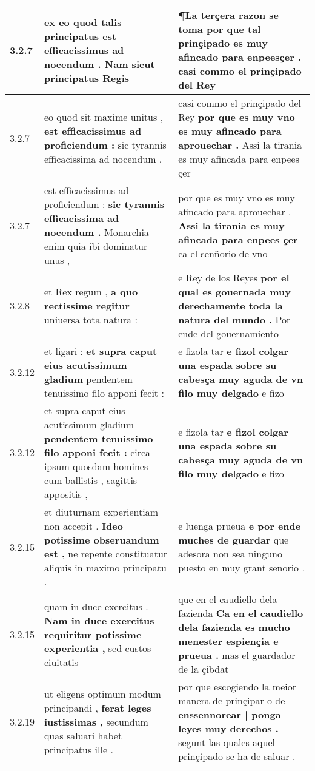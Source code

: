 \begin{tabular}{|p{1cm}|p{6.5cm}|p{6.5cm}|}
3.2.7 & ex eo quod talis principatus \textbf{ est efficacissimus ad nocendum . } Nam sicut principatus Regis & ¶La terçera razon se toma \textbf{ por que tal prinçipado es muy afincado para enpeesçer . } casi commo el prinçipado del Rey \\\hline
3.2.7 & eo quod sit maxime unitus , \textbf{ est efficacissimus ad proficiendum : } sic tyrannis efficacissima ad nocendum . & casi commo el prinçipado del Rey \textbf{ por que es muy vno es muy afincado para aprouechar . } Assi la tirania es muy afincada para enpees çer \\\hline
3.2.7 & est efficacissimus ad proficiendum : \textbf{ sic tyrannis efficacissima ad nocendum . } Monarchia enim quia ibi dominatur unus , & por que es muy vno es muy afincado para aprouechar . \textbf{ Assi la tirania es muy afincada para enpees çer } ca el senñorio de vno \\\hline
3.2.8 & et Rex regum , \textbf{ a quo rectissime regitur } uniuersa tota natura : & e Rey de los Reyes \textbf{ por el qual es gouernada muy derechamente toda la natura del mundo . } Por ende del gouernamiento \\\hline
3.2.12 & et ligari : \textbf{ et supra caput eius acutissimum gladium } pendentem tenuissimo filo apponi fecit : & e fizola tar \textbf{ e fizol colgar una espada sobre su cabesça muy aguda de vn filo muy delgado } e fizo \\\hline
3.2.12 & et supra caput eius acutissimum gladium \textbf{ pendentem tenuissimo filo apponi fecit : } circa ipsum quosdam homines cum ballistis , sagittis appositis , & e fizola tar \textbf{ e fizol colgar una espada sobre su cabesça muy aguda de vn filo muy delgado } e fizo \\\hline
3.2.15 & et diuturnam experientiam non accepit . \textbf{ Ideo potissime obseruandum est , } ne repente constituatur aliquis in maximo principatu . & e luenga prueua \textbf{ e por ende muches de guardar } que adesora non sea ninguno puesto en muy grant senorio . \\\hline
3.2.15 & quam in duce exercitus . \textbf{ Nam in duce exercitus requiritur potissime experientia , } sed custos ciuitatis & que en el caudiello dela fazienda \textbf{ Ca en el caudiello dela fazienda es mucho menester espiençia e prueua . } mas el guardador de la çibdat \\\hline
3.2.19 & ut eligens optimum modum principandi , \textbf{ ferat leges iustissimas , } secundum quas saluari habet principatus ille . & por que escogiendo la meior manera de prinçipar o de \textbf{ enssennorear | ponga leyes muy derechos . } segunt las quales aquel prinçipado se ha de saluar . \\\hline

\end{tabular}
